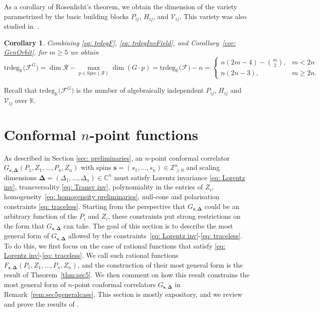 \documentclass[12pt,a4paper]{extarticle}
\newtheorem{corollary}[theorem]{Corollary}
\theoremstyle{definition}
\newcommand{\K}{\mathbb{K}}
\begin{document}
As a corollary of Rosenlicht’s theorem, we obtain the dimension of the variety
parametrized by the basic building blocks $P_{ij}$, $H_{ij}$, and $\mathcal{V}_{ij}$. This variety was also studied in~\cite{MSS}.
\begin{corollary}\label{cor: trdegF}
Combining \eqref{eq: trdegF}, \eqref{eq: trdegInvField}, and
Corollary~\ref{cor: GenOrbit}, for $m\ge 5$ we obtain
\begin{equation*}
   \mathrm{trdeg}_\K\bigl(\mathcal{F}^{G}\bigr)
=
   \dim \mathcal{R} - \max_{p \in \mathrm{Spec}(\mathcal{R})}\dim(G \cdot p) 
=\mathrm{trdeg}_\K\bigl(\mathcal{F}\bigr) - n
  =\begin{cases}
      n(2m-4)-{m \choose 2}, & m<2n\\
      n(2n-3), & m\geq 2n.
  \end{cases} 
\end{equation*}
\end{corollary}
\noindent Recall that $\mathrm{trdeg}_\K\bigl(\mathcal{F}^{G}\bigr)$ is the number of algebraically independent $P_{ij}$, $H_{ij}$ and $\mathcal{V}_{ij}$ over $\K$.

\section{Conformal $n$-point functions}\label{sec:ConfNpoint}

As described in Section \ref{sec: preliminaries}, an $n$-point conformal correlator $G_{\mathbf{s},\mathbf{\Delta}}(P_1,Z_1,\ldots,P_n,Z_n)$ with spins $\mathbf{s}=(s_1,\ldots,s_n)\in\mathbb{Z}_{\ge0}^n$ and scaling dimensions $\mathbf{\Delta}=(\Delta_1,\ldots,\Delta_n)\in\mathbb{C}^n$ must satisfy Lorentz invariance \eqref{eq: Lorentz inv}, transversality \eqref{eq: Transv inv}, polynomiality in the entries of $Z_i$, homogeneity~\eqref{eq: homogeneity preliminaries}, null-cone and polarisation constraints \eqref{eq: traceless}. Starting from the perspective that $G_{\mathbf{s},\mathbf{\Delta}}$ could be an arbitrary function of the $P_i$ and $Z_i$, these constraints put strong restrictions on the form that $G_{\mathbf{s},\mathbf{\Delta}}$ can take. 
The goal of this section is to describe the most general form of $G_{\mathbf{s},\mathbf{\Delta}}$ allowed by the constraints~\eqref{eq: Lorentz inv}-\eqref{eq: traceless}. To do this, we first focus on the case of rational functions that satisfy \eqref{eq: Lorentz inv}-\eqref{eq: traceless}. We call such rational functions $F_{\mathbf{s},\mathbf{\Delta}}(P_1,Z_1,\ldots,P_n,Z_n)$, and the construction of their most general form is the result of Theorem~\ref{thm:sec5}. We then comment on how this result constrains the most general form of $n$-point conformal correlators $G_{\mathbf{s},\mathbf{\Delta}}$ in Remark~\ref{rem:sec5generalcase}.
This section is mostly expository, and we review and prove the results of \cite[Section 4.4]{CPPR}.
\end{document}
